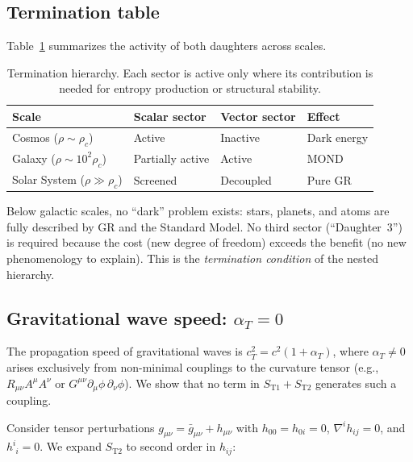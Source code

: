 \documentclass[aps,prd,twocolumn,superscriptaddress,nofootinbib]{revtex4-2}
\begin{document}
\subsection{Termination table}

Table~\ref{tab:termination} summarizes the activity of both daughters across scales.

\begin{table}[tbp]
\caption{\label{tab:termination}Termination hierarchy. Each sector is active only where its contribution is needed for entropy production or structural stability.}
\begin{ruledtabular}
\begin{tabular}{llll}
Scale & Scalar sector & Vector sector & Effect \\
\hline
Cosmos ($\rho \sim \rho_c$) & Active & Inactive & Dark energy \\
Galaxy ($\rho \sim 10^2\rho_c$) & Partially active & Active & MOND \\
Solar System ($\rho \gg \rho_c$) & Screened & Decoupled & Pure GR \\
\end{tabular}
\end{ruledtabular}
\end{table}

Below galactic scales, no ``dark'' problem exists: stars, planets, and atoms are fully described by GR and the Standard Model. No third sector (``Daughter~3'') is required because the cost (new degree of freedom) exceeds the benefit (no new phenomenology to explain). This is the \textit{termination condition} of the nested hierarchy.

\subsection{Gravitational wave speed: $\alpha_T = 0$}
\label{sec:alpha_T}

The propagation speed of gravitational waves is $c_T^2 = c^2(1 + \alpha_T)$, where $\alpha_T \neq 0$ arises exclusively from non-minimal couplings to the curvature tensor (e.g., $R_{\mu\nu}A^\mu A^\nu$ or $G^{\mu\nu}\partial_\mu\phi\,\partial_\nu\phi$). We show that no term in $S_{\mathrm{T1}} + S_{\mathrm{T2}}$ generates such a coupling.

Consider tensor perturbations $g_{\mu\nu} = \bar{g}_{\mu\nu} + h_{\mu\nu}$ with $h_{00} = h_{0i} = 0$, $\nabla^i h_{ij} = 0$, and $h^i_{\phantom{i}i} = 0$. We expand $S_{\mathrm{T2}}$ to second order in $h_{ij}$:
\end{document}

